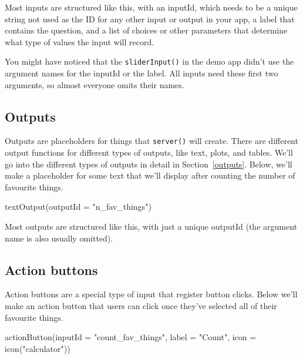 \documentclass[
  oneside]{book}
\newenvironment{Shaded}{\begin{snugshade}}{\end{snugshade}}
\newcommand{\AttributeTok}[1]{\textcolor[rgb]{0.77,0.63,0.00}{#1}}
\newcommand{\FunctionTok}[1]{\textcolor[rgb]{0.00,0.00,0.00}{#1}}
\newcommand{\NormalTok}[1]{#1}
\newcommand{\StringTok}[1]{\textcolor[rgb]{0.31,0.60,0.02}{#1}}
\begin{document}
Most inputs are structured like this, with an \AttributeTok{inputId}, which needs to be a unique string not used as the ID for any other input or output in your app, a \AttributeTok{label} that contains the question, and a list of \AttributeTok{choices} or other parameters that determine what type of values the input will record.

\begin{info}
You might have noticed that the \texttt{sliderInput}\texttt{()} in the demo app didn't use the argument names for the \AttributeTok{inputId} or the \AttributeTok{label}. All inputs need these first two arguments, so almost everyone omits their names.

\end{info}

\hypertarget{outputs-intro}{%
\subsection{Outputs}\label{outputs-intro}}

Outputs are placeholders for things that \texttt{server}\texttt{()} will create. There are different output functions for different types of outputs, like text, plots, and tables. We'll go into the different types of outputs in detail in Section~\ref{outputs}. Below, we'll make a placeholder for some text that we'll display after counting the number of favourite things.

\begin{Shaded}
\begin{Highlighting}[]
\FunctionTok{textOutput}\NormalTok{(}\AttributeTok{outputId =} \StringTok{"n\_fav\_things"}\NormalTok{)}
\end{Highlighting}
\end{Shaded}

Most outputs are structured like this, with just a unique \AttributeTok{outputId} (the argument name is also usually omitted).

\hypertarget{action-buttons}{%
\subsection{Action buttons}\label{action-buttons}}

Action buttons are a special type of input that register button clicks. Below we'll make an action button that users can click once they've selected all of their favourite things.

\begin{Shaded}
\begin{Highlighting}[]
\FunctionTok{actionButton}\NormalTok{(}\AttributeTok{inputId =} \StringTok{"count\_fav\_things"}\NormalTok{, }\AttributeTok{label =} \StringTok{"Count"}\NormalTok{, }\AttributeTok{icon =} \FunctionTok{icon}\NormalTok{(}\StringTok{"calculator"}\NormalTok{))}
\end{Highlighting}
\end{Shaded}
\end{document}
